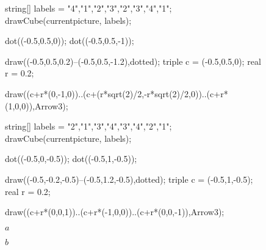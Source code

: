 \documentclass[../key.tex]{subfiles}
\begin{document}
\begin{figure}[h]
	\begin{center}
		\begin{minipage}[b]{0.45\textwidth}
			\centering
			\begin{asy}[width=0.7\textwidth]
			string[] labels = {"4","1","2","3","2","3","4","1"};
			drawCube(currentpicture, labels);
			
			dot((-0.5,0.5,0));
			dot((-0.5,0.5,-1));
			
			draw((-0.5,0.5,0.2)--(-0.5,0.5,-1.2),dotted);
			triple c = (-0.5,0.5,0);
			real r = 0.2;
			
			draw((c+r*(0,-1,0))..(c+(r*sqrt(2)/2,-r*sqrt(2)/2,0))..(c+r*(1,0,0)),Arrow3);
			
			\end{asy}
		\end{minipage}
		\hfill
		\begin{minipage}[b]{0.45\textwidth}
			\centering
			\begin{asy}[width=0.7\textwidth]
			string[] labels = {"2","1","3","4","3","4","2","1"};
			drawCube(currentpicture, labels);
			
			dot((-0.5,0,-0.5));
			dot((-0.5,1,-0.5));
			
			draw((-0.5,-0.2,-0.5)--(-0.5,1.2,-0.5),dotted);
			triple c = (-0.5,1,-0.5);
			real r = 0.2;
			
			draw((c+r*(0,0,1))..(c+r*(-1,0,0))..(c+r*(0,0,-1)),Arrow3);
			\end{asy}
		\end{minipage}
	\end{center}
	\vspace*{-2\baselineskip}
	\begin{center}
		\begin{minipage}[t]{0.45\textwidth}
			\centering
			$a$
		\end{minipage}
		\hfill
		\begin{minipage}[t]{0.45\textwidth}
			\centering
			$b$
		\end{minipage}
	\end{center}
	\vspace*{-2\baselineskip}
	\begin{center}
		\begin{minipage}[t]{\textwidth}
			\label{fig:cube_generating_rotations}
		\end{minipage}
	\end{center}
	\vspace*{-2\baselineskip}
\end{figure}
\end{document}
